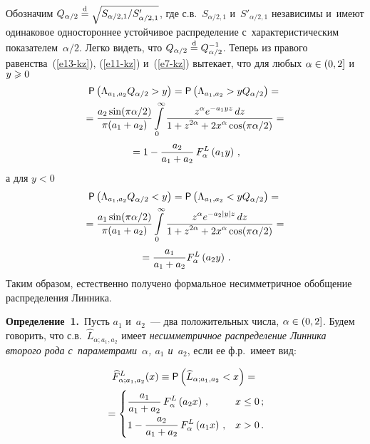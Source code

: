 \begin{multicols}{2}
Обозначим $Q_{\alpha/2}\stackrel{\mathrm{d}}{=}\sqrt{S_{\alpha/2,1}/S'_{\alpha/2,1}}$,
где с.в.~$S_{\alpha/2,1}$ и~$S'_{\alpha/2,1}$ независимы и~имеют
одинаковое одностороннее устойчивое распределение 
с~характеристическим показателем~$\alpha/2$. Легко видеть, что
$Q_{\alpha/2}\stackrel{\mathrm{d}}{=} Q^{-1}_{\alpha/2}$. Теперь из правого равенства~(\ref{e13-kz}), 
(\ref{e11-kz}) и~(\ref{e7-kz}) вытекает, что для любых $\alpha\hm\in(0,2]$ и~$y\hm\geqslant 0$
\begin{multline*}
{\sf P}\left(\Lambda_{a_1,a_2} Q_{\alpha/2}>y\right)= {\sf P}
\left(\Lambda_{a_1,a_2}>y Q_{\alpha/2}\right)={}
\\
{}=
\displaystyle\frac{\displaystyle a_2\sin(\pi\alpha/2)\mathstrut}{\displaystyle \pi(a_1+a_2)\mathstrut}\int\limits_{0}^{\infty}
\displaystyle\frac{\displaystyle z^{\alpha}e^{-a_1yz}\,dz\mathstrut}{\displaystyle 1+z^{2\alpha}+2x^{\alpha}\cos(\pi\alpha/2)\mathstrut}={}\\
{}=
1-\displaystyle\frac{\displaystyle a_2\mathstrut}{\displaystyle a_1+a_2\mathstrut}\,F^{L}_{\alpha}\left(a_1y\right)\,,
\end{multline*}
а для $y<0$
\begin{multline*}
{\sf P}\left(\Lambda_{a_1,a_2} Q_{\alpha/2}<y\right)= {\sf P}
\left(\Lambda_{a_1,a_2}<y Q_{\alpha/2}\right)={}
\\{}=
\displaystyle\frac{\displaystyle a_1\sin(\pi\alpha/2)\mathstrut}{\displaystyle \pi(a_1+a_2)\mathstrut}\int\limits_{0}^{\infty}
\displaystyle\frac{\displaystyle z^{\alpha}e^{-a_2|y|z}\,dz\mathstrut}{\displaystyle 1+z^{2\alpha}+2x^{\alpha}\cos(\pi\alpha/2)\mathstrut}={}\\
{}=
\displaystyle\frac{\displaystyle a_1\mathstrut}{\displaystyle a_1+a_2\mathstrut}F^{L}_{\alpha}\left(a_2y\right)\,.
\end{multline*}
Таким образом, естественно получено формальное несимметричное
обобщение распределения Линника.

\smallskip

\noindent
\textbf{Определение~1.}\ Пусть $a_1$ и~$a_2$~--- два положительных
числа, $\alpha\hm\in(0,2]$. Будем говорить, что с.в.~$\widehat
L_{\alpha;a_1,a_2}$ имеет \textit{несимметричное распределение Линника
второго рода с~параметрами~$\alpha$, $a_1$ и~$a_2$}, если ее ф.р.\
имеет вид:

\noindent
\begin{multline*}
\widehat F^{L}_{\alpha;a_1,a_2}(x)\equiv {\sf P}\left(
\widehat L_{\alpha;a_1,a_2}<x\right) ={}\\
{}=
\begin{cases}
\displaystyle\displaystyle\frac{\displaystyle a_1 \mathstrut}{\displaystyle a_1+a_2\mathstrut}\, F^{L}_{\alpha}\left(a_2x\right)\,, & x\leq0\,;\\
\displaystyle 1-\displaystyle\frac{\displaystyle a_2\mathstrut}{\displaystyle a_1+a_2\mathstrut}\, F^{L}_{\alpha}\left(a_1x\right)\,, &
x> 0\,.
\end{cases}
\end{multline*}

\smallskip


\end{multicols}

